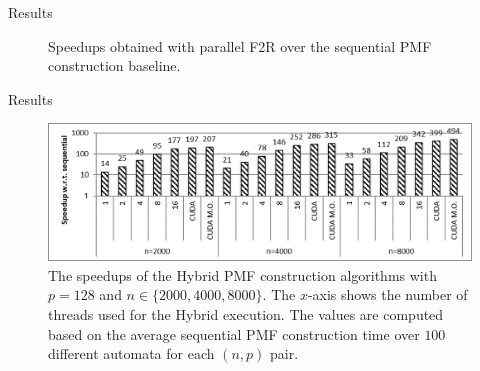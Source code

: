 \documentclass{beamer}
\begin{document}
\begin{frame}{Results}
\begin{figure}[ht]
{	}
	\caption{Speedups obtained with parallel F2R over the sequential PMF construction baseline.}
\end{figure}
\end{frame}

\begin{frame}{Results}
\begin{figure}[ht]
	\centering
	\includegraphics[height=0.4\textheight]{figs/hybrid_speedup_p128.png}
	
	\caption{The speedups of the Hybrid PMF construction algorithms with $p = 128$ and $n \in \{2000, 4000, 8000\}$. The $x$-axis shows the number of threads used for the Hybrid execution.  The values are computed based on the average sequential PMF construction time over $100$ different automata for each $(n, p)$ pair.}
	\label{fig:hybrid-speedup}
\end{figure}
\end{frame}
\end{document}
